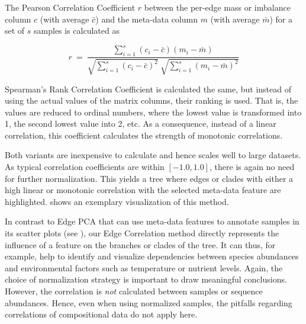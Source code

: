 The Pearson Correlation Coefficient $r$ between the per-edge mass or imbalance column $c$ (with average $\bar{c}$)
and the meta-data column $m$ (with average $\bar{m}$) for a set of $s$ samples is calculated as

\begin{equation}
    \label{ch:Visualization:eq:PCC}
    r ~=~ \frac{ \sum_{i=1}^{s} (c_i - \bar{c})(m_i - \bar{m}) }{ \sqrt{ \sum_{i=1}^{s} (c_i - \bar{c})^2 } ~ \sqrt{ \sum_{i=1}^{s} (m_i - \bar{m})^2 } }
\end{equation}

Spearman's Rank Correlation Coefficient is calculated the same, but instead of using the actual values
of the matrix columns, their ranking is used.
That is, the values are reduced to ordinal numbers, where the lowest value is transformed into \num{1},
the second lowest value into \num{2}, etc.
As a consequence, instead of a linear correlation, this coefficient calculates the strength of monotonic correlations.

Both variants are inexpensive to calculate and hence scales well to large datasets.
As typical correlation coefficients are within $[ -1.0, 1.0 ]$, there is again no need for further normalization.
This yields a tree where edges or clades with either a high linear or monotonic correlation
with the selected meta-data feature are highlighted.
 shows an exemplary visualization of this method.

In contrast to Edge PCA \cite{Matsen2011a} that can use meta-data features to annotate samples in its scatter plots
(see ),
our Edge Correlation method directly represents the influence of a feature on the branches or clades of the tree.
It can thus, for example, help to identify and visualize dependencies
between species abundances and environmental factors such as temperature or nutrient levels.
Again, the choice of normalization strategy is important to draw meaningful conclusions.
However, the correlation is \emph{not} calculated between samples or sequence abundances.
Hence, even when using normalized samples, %
the pitfalls regarding correlations of compositional data \cite{Lovell2015} do not apply here.


